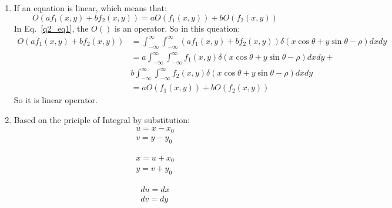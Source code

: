 \documentclass[12pt]{article}
\begin{document}
\begin{enumerate}[leftmargin=\labelsep]
\begin{enumerate}
    \item  If an equation is linear, which means that:
    \begin{equation}
        O(af_{1}(x, y) + bf_{2}(x, y)) = aO(f_{1}(x, y)) + bO(f_{2}(x, y))
        \label{q2_eq1}
    \end{equation}
    In Eq.~\ref{q2_eq1}, the $O()$ is an operator.
    So in this queation:
    \begin{equation}
        \begin{aligned}
        O(af_{1}(x, y) + bf_{2}(x, y))
        &= \int_{-\infty}^{\infty}\int_{-\infty}^{\infty}(af_1(x, y) + bf_2(x, y))\delta(x\cos\theta + y\sin\theta - \rho)dxdy\\
        &= a\int_{-\infty}^{\infty}\int_{-\infty}^{\infty}f_1(x, y)\delta(x\cos\theta + y\sin\theta - \rho)dxdy + \\
        & b\int_{-\infty}^{\infty}\int_{-\infty}^{\infty}f_2(x, y)\delta(x\cos\theta + y\sin\theta - \rho)dxdy\\
        &= aO(f_1(x, y)) + bO(f_2(x, y))
        \end{aligned}
    \end{equation}
    So it is linear operator.

    \item Based on the priciple of Integral by substitution:
    \begin{equation}
     \begin{aligned}
        u = x - x_0\\
        v = y - y_0
        \end{aligned}
    \end{equation}

    \begin{equation}
        \begin{aligned}
            x = u + x_0\\
            y = v + y_0
        \end{aligned}
    \end{equation}

    \begin{equation}
        \begin{aligned}
            du = dx \\
            dv = dy
        \end{aligned}
    \end{equation}


\end{enumerate}
\end{enumerate}
\end{document}
